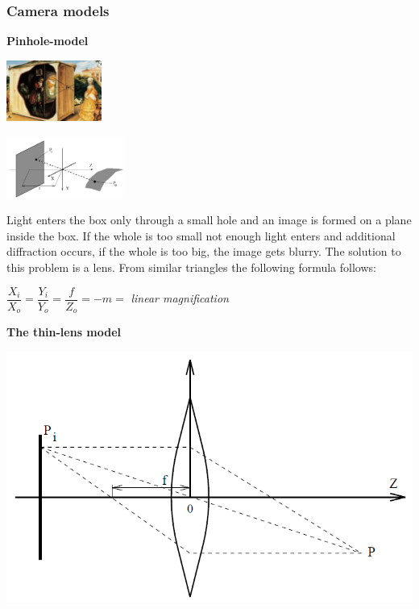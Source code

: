 \documentclass[a4paper, fontsize=8pt, landscape, DIV=1]{scrartcl}
\begin{document}
\begin{multicols*}{4}
		\subsubsection{Camera models}
		\textbf{Pinhole-model}\\
		\begin{minipage}[b]{0.49\columnwidth}
			\begin{flushleft}
				\includegraphics[width=\columnwidth, height=2cm]{images//ImageAcq/pinhole_1.png}\\
			\end{flushleft}
		\end{minipage}
		\begin{minipage}[t]{0.49\columnwidth}
			\begin{flushleft}
				\includegraphics[width=\columnwidth, height=2cm]{images//ImageAcq/pinhole_2.png}\\
			\end{flushleft}
		\end{minipage}
		Light enters the box only through a small hole and an image is formed on a plane inside the box. If the whole is too small not enough light enters and additional diffraction occurs, if the whole is too big, the image gets blurry. The solution to this problem is a lens. From similar triangles the following formula follows:
		\begin{center}
			$\dfrac{X_i}{X_o}=\dfrac{Y_i}{Y_o}=\dfrac{f}{Z_o}=-m=$ \textit{linear magnification}\\
		\end{center}
		\vspace{0.5cm}
		\textbf{The thin-lens model}\\
		\begin{center}
			\includegraphics[width=0.7\columnwidth]{images//ImageAcq/thin_lens.png}\\

\end{center}
\end{multicols*}
\end{document}
